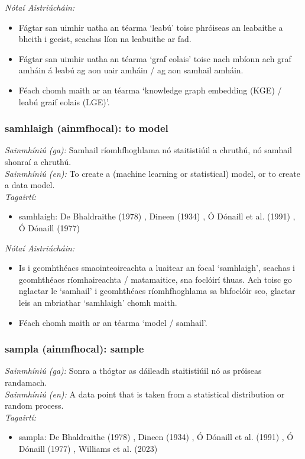 \documentclass{article}
\begin{document}
 \noindent \textit{Nótaí Aistriúcháin:}
\begin{itemize}
	\item Fágtar san uimhir uatha an téarma `leabú' toisc phróiseas an leabaithe a bheith i gceist, seachas líon na leabuithe ar fad.
	\item Fágtar san uimhir uatha an téarma `graf eolais' toisc nach mbíonn ach graf amháin á leabú ag aon uair amháin / ag aon samhail amháin.
	\item Féach chomh maith ar an téarma `knowledge graph embedding (KGE) / leabú graif eolais (LGE)'.
\end{itemize}


\subsubsection*{samhlaigh (ainmfhocal): to model}
 \noindent \textit{Sainmhíniú (ga):} Samhail ríomhfhoghlama nó staitistiúil a chruthú, nó samhail shonraí a chruthú.
\\
 \noindent \textit{Sainmhíniú (en):} To create a (machine learning or statistical) model, or to create a data model.
\\
 \noindent \textit{Tagairtí:}
\begin{itemize}
	\item samhlaigh: De Bhaldraithe (1978) \cite{de-bhaldraithe}, Dineen (1934) \cite{dineen}, Ó Dónaill et al. (1991) \cite{focloir-beag}, Ó Dónaill (1977) \cite{odonaill}
\end{itemize}

 \noindent \textit{Nótaí Aistriúcháin:}
\begin{itemize}
	\item Is i gcomhthéacs smaointeoireachta a luaitear an focal `samhlaigh', seachas i gcomhthéacs ríomhaireachta / matamaitice, sna foclóirí thuas. Ach toisc go nglactar le `samhail' i gcomhthéacs ríomhfhoghlama sa bhfoclóir seo, glactar leis an mbriathar `samhlaigh' chomh maith.
	\item Féach chomh maith ar an téarma `model / samhail'.
\end{itemize}


\subsubsection*{sampla (ainmfhocal): sample}
 \noindent \textit{Sainmhíniú (ga):} Sonra a thógtar as dáileadh staitistiúil nó as próiseas randamach.
\\
 \noindent \textit{Sainmhíniú (en):} A data point that is taken from a statistical distribution or random process.
\\
 \noindent \textit{Tagairtí:}
\begin{itemize}
	\item sampla: De Bhaldraithe (1978) \cite{de-bhaldraithe}, Dineen (1934) \cite{dineen}, Ó Dónaill et al. (1991) \cite{focloir-beag}, Ó Dónaill (1977) \cite{odonaill}, Williams et al. (2023) \cite{storchiste}
\end{itemize}
\end{document}
